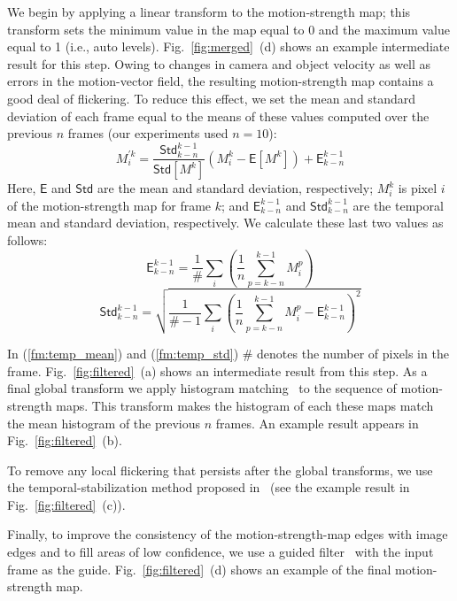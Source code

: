 \documentclass[14pt, a4paper]{extarticle}
\begin{document}
We begin by applying a linear transform to the motion-strength map; this transform sets the minimum value 
in the map equal to 0 and the maximum value equal to 1 (i.e., auto levels). Fig.~\ref{fig:merged}~(d) shows 
an example intermediate result for this step. Owing to changes in camera and object velocity as well as 
errors in the motion-vector field, the resulting motion-strength map contains a good deal of flickering. 
To reduce this effect, we set the mean and standard deviation of each frame equal to the means 
of these values computed over the previous $n$ frames (our experiments used $n = 10$):
\begin{equation}
M_{i}^{'k} = \frac{\mathsf{Std}_{k-n}^{k-1}}{\mathsf{Std}\left[M^k\right]} \left( M_i^k - \mathsf{E}\left[M^k\right]\right) + \mathsf{E}_{k-n}^{k-1}
\end{equation}
Here, $\mathsf{E}$ and $\mathsf{Std}$ are the mean and standard deviation, respectively; 
$M^k_i$ is pixel $i$ of the motion-strength map for frame $k$; and $\mathsf{E}_{k-n}^{k-1}$ and 
$\mathsf{Std}_{k-n}^{k-1}$ are the temporal mean and standard deviation, respectively. 
We calculate these last two values as follows:
\begin{equation}
\mathsf{E}_{k-n}^{k-1} =  \frac{1}{\#} \sum_{i}\left(\frac{1}{n}\sum_{p=k-n}^{k-1}M_i^p\right)
\label{fm:temp_mean}
\end{equation}
\begin{equation}
\mathsf{Std}_{k-n}^{k-1} = \sqrt{\frac{1}{\# - 1} \sum_{i}\left(\frac{1}{n}\sum_{p=k-n}^{k-1}M_i^p - \mathsf{E}_{k-n}^{k-1}\right)^2}
\label{fm:temp_std}
\end{equation}

In (\ref{fm:temp_mean}) and (\ref{fm:temp_std}) $\#$ denotes the number of pixels in the frame.
Fig.~\ref{fig:filtered}~(a) shows an intermediate result from this step. As a final global transform 
we apply histogram matching~\cite{fecker2007time} to the sequence of motion-strength maps. 
This transform makes the histogram of each these maps match the mean 
histogram of the previous $n$ frames. An example result appears in Fig.~\ref{fig:filtered}~(b).

To remove any local flickering that persists after the global transforms, we use  the
temporal-stabilization method proposed in~\cite{matyunin2011temporal} 
(see the example result in Fig.~\ref{fig:filtered}~(c)).



Finally, to improve the consistency of the motion-strength-map edges with image edges and 
to fill areas of low confidence, we use a guided filter~\cite{he2013guided} with the input frame 
as the guide. Fig.~\ref{fig:filtered}~(d) shows an example of the final motion-strength map.
\end{document}

